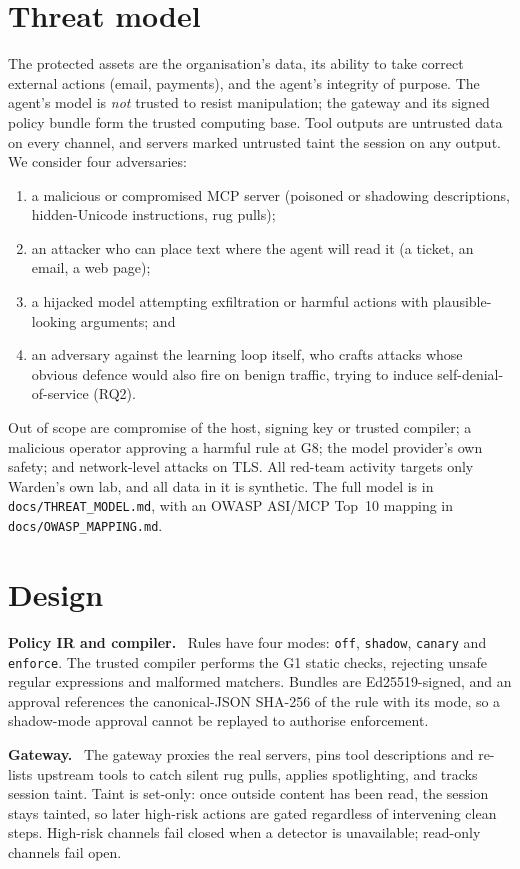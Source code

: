 \documentclass[11pt,a4paper]{article}
\newcommand{\sidebar}[1]{\par\smallskip\noindent\textbf{#1}\ }
\begin{document}
\section{Threat model}
The protected assets are the organisation's data, its ability to take correct external actions
(email, payments), and the agent's integrity of purpose. The agent's model is \emph{not} trusted to
resist manipulation; the gateway and its signed policy bundle form the trusted computing base.
Tool outputs are untrusted data on every channel, and servers marked untrusted taint the session
on any output. We consider four adversaries:
\begin{enumerate}
  \item a malicious or compromised MCP server (poisoned or shadowing descriptions, hidden-Unicode instructions, rug pulls);
  \item an attacker who can place text where the agent will read it (a ticket, an email, a web page);
  \item a hijacked model attempting exfiltration or harmful actions with plausible-looking arguments; and
  \item an adversary against the learning loop itself, who crafts attacks whose obvious defence would also fire on benign traffic, trying to induce self-denial-of-service (RQ2).
\end{enumerate}
Out of scope are compromise of the host, signing key or trusted compiler; a malicious operator
approving a harmful rule at G8; the model provider's own safety; and network-level attacks on TLS.
All red-team activity targets only Warden's own lab, and all data in it is synthetic. The full
model is in \texttt{docs/THREAT\_MODEL.md}, with an OWASP ASI/MCP Top~10 mapping in
\texttt{docs/OWASP\_MAPPING.md}.

\section{Design}
\sidebar{Policy IR and compiler.} Rules have four modes: \texttt{off}, \texttt{shadow},
\texttt{canary} and \texttt{enforce}. The trusted compiler performs the G1 static checks, rejecting
unsafe regular expressions and malformed matchers. Bundles are Ed25519-signed, and an approval
references the canonical-JSON SHA-256 of the rule with its mode, so a shadow-mode approval cannot be
replayed to authorise enforcement.

\sidebar{Gateway.} The gateway proxies the real servers, pins tool descriptions and re-lists
upstream tools to catch silent rug pulls, applies spotlighting, and tracks session taint. Taint is
set-only: once outside content has been read, the session stays tainted, so later high-risk actions
are gated regardless of intervening clean steps. High-risk channels fail closed when a detector is
unavailable; read-only channels fail open.
\end{document}
